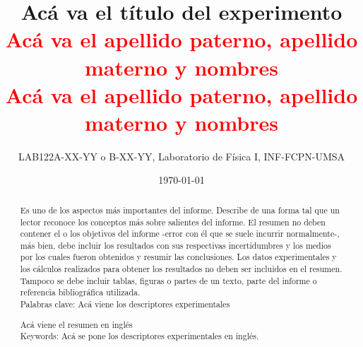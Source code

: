 \documentclass[11pt]{article}
\title{\textbf{Acá va el título del experimento}\\{\textcolor{red}{Acá va el apellido paterno, apellido materno y nombres\\Acá va el apellido paterno, apellido materno y nombres}}}
\author{LAB122A-XX-YY o B-XX-YY, Laboratorio de Física I, INF-FCPN-UMSA}
\date{\today}
\begin{document}
    \maketitle
    \begin{abstract}
        \noindent Es uno de los aspectos más importantes del informe. Describe de una forma tal que un lector reconoce los conceptos más sobre salientes del informe. El resumen no deben contener el o los objetivos del informe -error con él que se suele incurrir normalmente-, más bien, debe incluir los resultados con sus respectivas incertidumbres y los medios por los cuales fueron obtenidos y resumir las conclusiones. Los datos experimentales y los cálculos realizados para obtener los resultados no deben ser incluidos en el resumen. Tampoco se debe incluir tablas, figuras o partes de un texto, parte del informe o referencia bibliográfica utilizada.\\
        Palabras clave: Acá viene los descriptores experimentales
    \end{abstract}
    \begin{abstract}
        \noindent Acá viene el resumen en inglés \\
        Keywords: Acá se pone los descriptores experimentales en inglés.
    \end{abstract}
\end{document}
